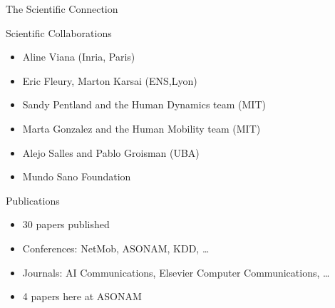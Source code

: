 \documentclass{beamer}
\begin{document}
\begin{frame}{The Scientific Connection}
\begin{block}{Scientific Collaborations}
\begin{itemize}
\item Aline Viana (Inria, Paris)
\item Eric Fleury, Marton Karsai (ENS,Lyon)
\item Sandy Pentland and the Human Dynamics team (MIT)
\item Marta Gonzalez and the Human Mobility team (MIT)
\item Alejo Salles and Pablo Groisman (UBA)
\item Mundo Sano Foundation
\end{itemize}
\end{block}

\pause

\begin{block}{Publications}
\begin{itemize}
\item 30 papers published
\item Conferences: NetMob, ASONAM, KDD, \ldots
\item Journals: AI Communications, Elsevier Computer Communications, \ldots
\item 4 papers here at ASONAM
\end{itemize}
\end{block}

\bigskip

\cite{leo2015socioeconomic}
\cite{gonzalez2008understanding,sarraute2015city}
\cite{mcpherson2001birds}
\cite{sarraute2014}

\end{frame}
\end{document}
